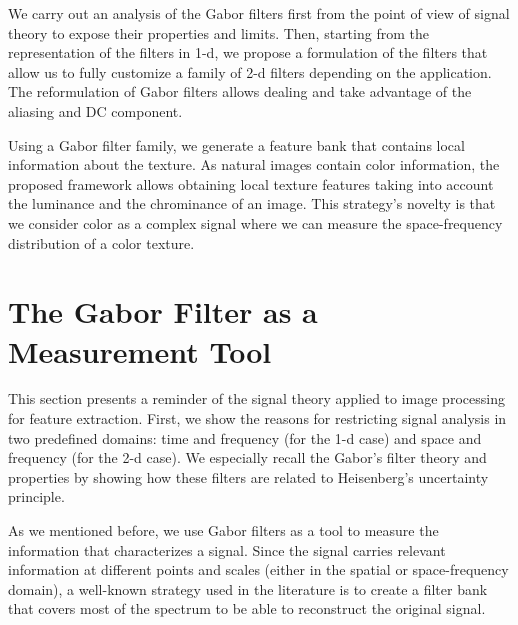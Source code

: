 We carry out an analysis of the Gabor filters first from the point of view of signal theory to expose their properties and limits. Then, starting from the representation of the filters in 1-d, we propose a formulation of the filters that allow us to fully customize a family of 2-d filters depending on the application. The reformulation of Gabor filters allows dealing and take advantage of the aliasing and DC component. 

Using a Gabor filter family, we generate a feature bank that contains local information about the texture. As natural images contain color information, the proposed framework allows obtaining local texture features taking into account the luminance and the chrominance of an image. This strategy's novelty is that we consider color as a complex signal where we can measure the space-frequency distribution of a color texture. 

\section{The Gabor Filter as a Measurement Tool}\label{ch:gabor_filter_description}

This section presents a reminder of the signal theory applied to image processing for feature extraction. First, we show the reasons for restricting signal analysis in two predefined domains: time and frequency (for the 1-d case) and space and frequency (for the 2-d case). We especially recall the Gabor's filter theory and properties by showing how these filters are related to Heisenberg's uncertainty principle.

As we mentioned before, we use Gabor filters as a tool to measure the information that characterizes a signal. Since the signal carries relevant information at different points and scales (either in the spatial or space-frequency domain), a well-known strategy used in the literature is to create a filter bank that covers most of the spectrum to be able to reconstruct the original signal.

